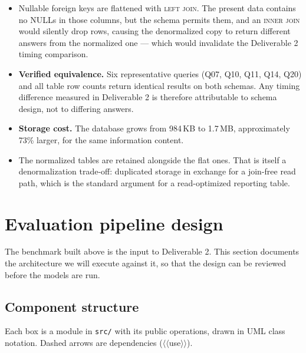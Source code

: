 \documentclass[11pt]{article}
\begin{document}
\begin{itemize}[leftmargin=*,topsep=2pt,itemsep=3pt]
  \item Nullable foreign keys are flattened with \textsc{left join}. The present data contains no
    NULLs in those columns, but the schema permits them, and an \textsc{inner join} would
    silently drop rows, causing the denormalized copy to return different answers from the
    normalized one --- which would invalidate the Deliverable 2 timing comparison.
  \item \textbf{Verified equivalence.} Six representative queries (Q07, Q10, Q11, Q14, Q20) and
    all table row counts return identical results on both schemas. Any timing difference measured
    in Deliverable 2 is therefore attributable to schema design, not to differing answers.
  \item \textbf{Storage cost.} The database grows from 984\,KB to 1.7\,MB, approximately 73\%
    larger, for the same information content.
  \item The normalized tables are retained alongside the flat ones. That is itself a
    denormalization trade-off: duplicated storage in exchange for a join-free read path, which is
    the standard argument for a read-optimized reporting table.
\end{itemize}

\section{Evaluation pipeline design}\label{sec:pipeline}

The benchmark built above is the input to Deliverable 2. This section documents the architecture
we will execute against it, so that the design can be reviewed before the models are run.

\subsection{Component structure}

Each box is a module in \texttt{src/} with its public operations, drawn in UML class notation.
Dashed arrows are dependencies ($\langle\langle$use$\rangle\rangle$).
\end{document}
